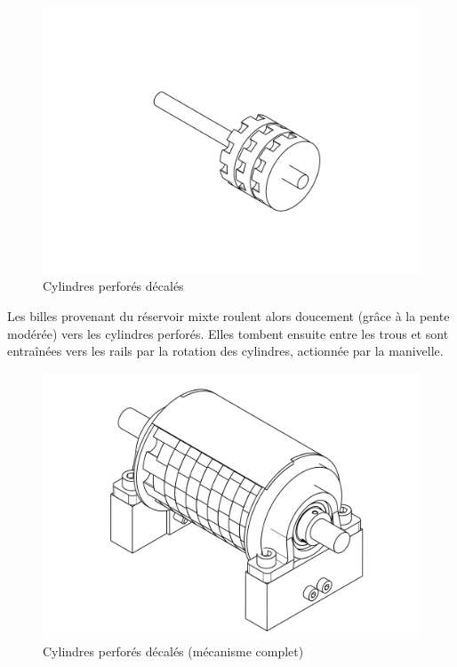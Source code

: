 \begin{figure}
    \centering
    \includegraphics[width=\textwidth]{Graphics/Roue/DRAWING_ROUES_DENTEES_DECALES.pdf}
    \caption{Cylindres perforés décalés}
\end{figure}

Les billes provenant du réservoir mixte roulent alors doucement (grâce à la pente modérée)  vers les cylindres perforés. Elles tombent ensuite entre les trous et sont entraînées vers les rails par la rotation des cylindres, actionnée par la manivelle.

\begin{figure}
    \centering
    \includegraphics[width=\textwidth]{Graphics/Roue/DRAWING_COUVERCLE_COMPLET.pdf}
    \caption{Cylindres perforés décalés (mécanisme complet)}
\end{figure}

